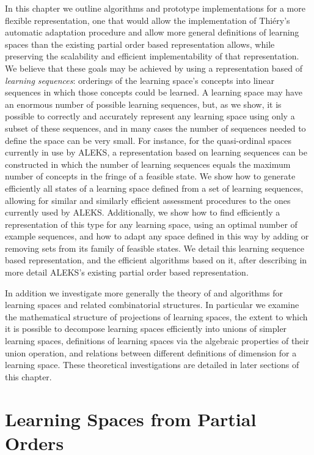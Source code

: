 \documentclass[11pt]{llncs}
\begin{document}
{In this chapter we outline algorithms and prototype implementations for a more flexible representation, one that would allow the implementation of Thi\'ery's automatic adaptation procedure and allow more general definitions of learning spaces than the existing partial order based representation allows, while preserving the scalability and efficient implementability of that representation. We believe that these goals may be achieved by using a representation based of \emph{learning sequences}: orderings of the learning space's concepts into linear sequences in which those concepts could be learned. A learning space may have an enormous number of possible learning sequences, but, as we show, it is possible to correctly and accurately represent any learning space using only a subset of these sequences, and in many cases the number of sequences needed to define the space can be very small. For instance, for the quasi-ordinal spaces currently in use by ALEKS, a representation based on learning sequences can be constructed in which the number of learning sequences equals the maximum number of concepts in the fringe of a feasible state. We show how to generate efficiently all states of a learning space defined from a set of learning sequences, allowing for similar and similarly efficient assessment procedures to the ones currently used by ALEKS. Additionally, we show how to find efficiently a representation of this type for any learning space, using an optimal number of example sequences, and how to adapt any space defined in this way by adding or removing sets from its family of feasible states. We detail this learning sequence based representation, and the efficient algorithms based on it, after describing in more detail ALEKS's existing partial order based representation.

In addition we investigate more generally the theory of and algorithms for learning spaces and related combinatorial structures. In particular we examine the mathematical structure of projections of learning spaces, the extent to which it is possible to decompose learning spaces efficiently into unions of simpler learning spaces, definitions of learning spaces via the algebraic properties of their union operation, and relations between different definitions of dimension for a learning space. These theoretical investigations are detailed in later sections of this chapter.

\section{Learning Spaces from Partial Orders}

}
\end{document}
